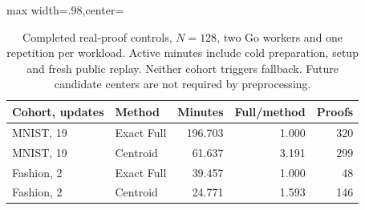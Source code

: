 \begin{table}[tbp]
\centering
\caption{Completed real-proof controls, $N=128$, two Go workers and one repetition per workload. Active minutes include cold preparation, setup and fresh public replay. Neither cohort triggers fallback. Future candidate centers are not required by preprocessing.}
\label{tab:completed-proofs}
\begin{adjustbox}{max width=.98\textwidth,center=\textwidth}
\begin{tabular}{llrrr}
\toprule
Cohort, updates & Method & Minutes & Full/method & Proofs\\
\midrule
MNIST, 19 & Exact Full & 196.703 & 1.000 & 320\\
MNIST, 19 & Centroid & 61.637 & 3.191 & 299\\
Fashion, 2 & Exact Full & 39.457 & 1.000 & 48\\
Fashion, 2 & Centroid & 24.771 & 1.593 & 146\\
\bottomrule
\end{tabular}
\end{adjustbox}
\end{table}
